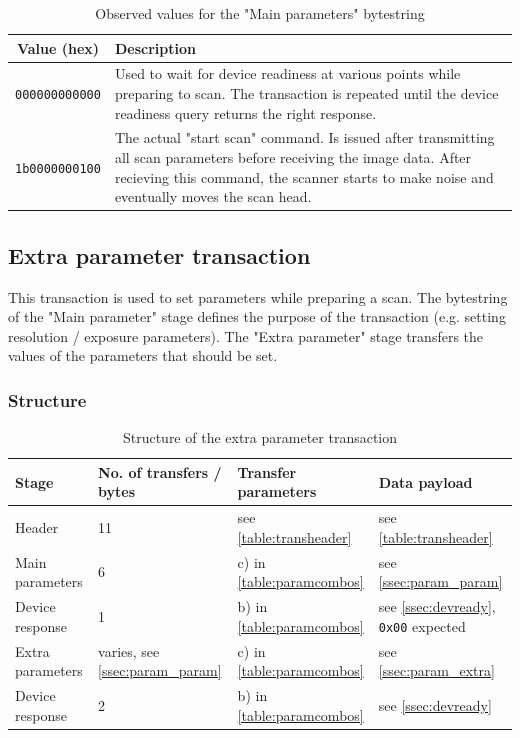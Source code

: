 \documentclass{article}
\begin{document}
\begin{table}[H]
  \caption{Observed values for the "Main parameters" bytestring}
  \centering
  \begin{tabular}{c | p{9cm}}
    Value (hex) & Description \\ \hline
    {\tt 000000000000} & Used to wait for device readiness at various points while preparing to scan. The transaction is repeated
                         until the device readiness query returns the right response.
                         \\
    {\tt 1b0000000100} & The actual "start scan" command. Is issued after transmitting all scan parameters
                         before receiving the image data. After recieving this command, the scanner
                         starts to make noise and eventually moves the scan head. \\
  \end{tabular}
\end{table}

\subsection{Extra parameter transaction}

This transaction is used to set parameters while preparing a scan.
The bytestring of the "Main parameter" stage defines the purpose of the transaction
(e.g. setting resolution / exposure parameters). The "Extra parameter" stage
transfers the values of the parameters that should be set.

\subsubsection{Structure}

\begin{table}[H]
  \caption{Structure of the extra parameter transaction}
  \centering
  \begin{tabular}{p{3cm} | p{1.5cm} | p{3cm} | p{3cm}}
    Stage & No. of transfers / bytes & Transfer parameters & Data payload \\ \hline
    
    Header & 11 & see \autoref{table:transheader} & see \autoref{table:transheader} \\
    Main parameters & 6 & c) in \autoref{table:paramcombos} & see \ref{ssec:param_param} \\
    Device response & 1 & b) in \autoref{table:paramcombos} & see \ref{ssec:devready}, {\tt 0x00} expected \\
    Extra parameters & varies, see \ref{ssec:param_param} & c) in \autoref{table:paramcombos} & see \ref{ssec:param_extra} \\
    Device response & 2 & b) in \autoref{table:paramcombos} & see \ref{ssec:devready} \\
  \end{tabular}
\end{table}
\end{document}
